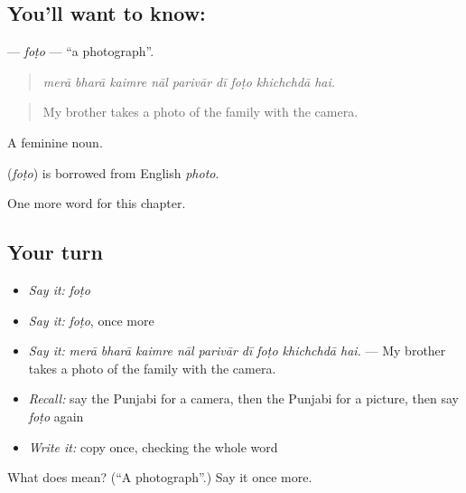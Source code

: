 \subsection*{You'll want to know: }
\textbf{} — \emph{foṭo} — \textquotedblleft{}a photograph\textquotedblright{}.

\begin{quote}
        
\end{quote}

\begin{quote}
\emph{merā bharā kaimre nāl parivār dī foṭo khichchdā hai.}
\end{quote}

\begin{quote}
My brother takes a photo of the family with the camera.
\end{quote}

A feminine noun.

\begin{cousinweb}
\textbf{} (\emph{foṭo}) is borrowed from English \emph{photo}.
\end{cousinweb}

\begin{grammarlens}[title={What you've built}]
One more word for this chapter.
\end{grammarlens}

\subsection*{Your turn}
\begin{itemize}
\raggedright
  \item \emph{Say it:} \emph{foṭo}
  \item \emph{Say it:} \emph{foṭo}, once more
  \item \emph{Say it:} \emph{merā bharā kaimre nāl parivār dī foṭo khichchdā hai.} — My brother takes a photo of the family with the camera.
  \item \emph{Recall:} say the Punjabi for a camera, then the Punjabi for a picture, then say \emph{foṭo} again
  \item \emph{Write it:} copy \textbf{} once, checking the whole word
\end{itemize}

\begin{tcolorbox}[breakable,colback=teal!4,colframe=teal!35!black,title={Before you move on}]
What does  mean? (\textquotedblleft{}A photograph\textquotedblright{}.) Say it once more.
\end{tcolorbox}

